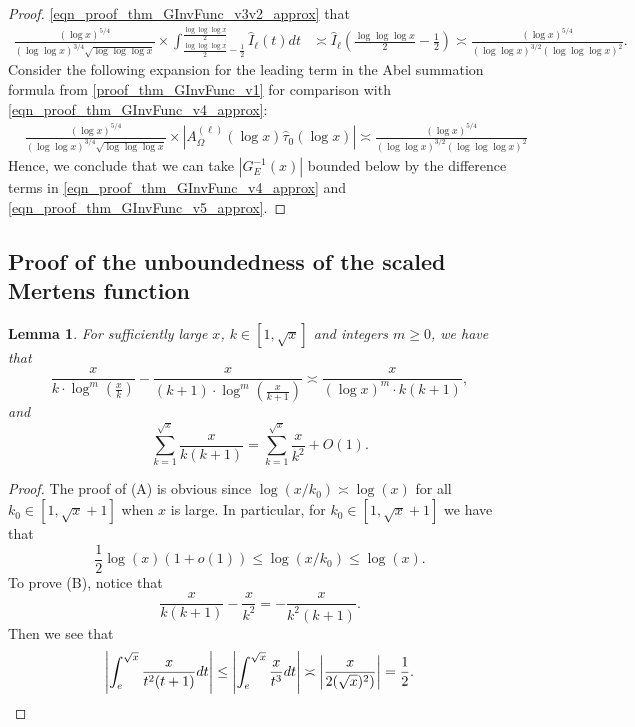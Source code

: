\documentclass[11pt,reqno,a4letter]{article}
\numberwithin{figure}{section}
\numberwithin{table}{section}
\theoremstyle{plain}
\newtheorem{lemma}[theorem]{Lemma}
\numberwithin{theorem}{section}
\theoremstyle{definition}
\begin{document}
\begin{proof}
\eqref{eqn_proof_thm_GInvFunc_v3v2_approx} that 
\begin{align} 
\label{eqn_proof_thm_GInvFunc_v4_approx} 
\frac{(\log x)^{5/4}}{(\log\log x)^{3/4} \sqrt{\log\log\log x}} \times 
     \int_{\frac{\log\log\log x}{2}-\frac{1}{2}}^{\frac{\log\log\log x}{2}} 
     \widehat{I}_{\ell}(t) dt & \asymp 
     \widehat{I}_{\ell}\left(\frac{\log\log\log x}{2}-\frac{1}{2}\right) 
     \asymp \frac{(\log x)^{5/4}}{(\log\log x)^{3/2}(\log\log\log x)^2}. 
\end{align} 
Consider the following expansion for the leading term in 
the Abel summation formula from \eqref{proof_thm_GInvFunc_v1} for comparison with 
\eqref{eqn_proof_thm_GInvFunc_v4_approx}: 
\begin{align} 
\label{eqn_proof_thm_GInvFunc_v5_approx} 
 & \frac{(\log x)^{5/4}}{(\log\log x)^{3/4} \sqrt{\log\log\log x}} \times 
     \left\lvert A_{\Omega}^{(\ell)}(\log x) \widehat{\tau}_0(\log x) \right\rvert 
     \asymp 
     \frac{(\log x)^{5/4}}{(\log\log x)^{3/2} (\log\log\log x)^2}
\end{align} 
Hence, we conclude that we can take $\left\lvert G_{E}^{-1}\left(x\right) \right\rvert$ 
bounded below by the difference terms in 
\eqref{eqn_proof_thm_GInvFunc_v4_approx} and 
\eqref{eqn_proof_thm_GInvFunc_v5_approx}. 
\end{proof} 

\subsection{Proof of the unboundedness of the scaled Mertens function}
\label{subSection_TheCoreResultProof} 

\begin{lemma}
\label{lemma_PrimePix_ErrorBoundDiffs_SimplifyingConditions_v1} 
For sufficiently large $x$, $k \in [1, \sqrt{x}]$ and integers $m \geq 0$, we have that 
\begin{equation} 
\tag{A} 
\frac{x}{k \cdot \log^m\left(\frac{x}{k}\right)} - \frac{x}{(k+1) \cdot \log^m\left(\frac{x}{k+1}\right)}
     \asymp \frac{x}{(\log x)^m \cdot k(k+1)}, 
\end{equation} 
and 
\begin{equation} 
\tag{B} 
\sum_{k=1}^{\sqrt{x}} \frac{x}{k(k+1)} = \sum_{k=1}^{\sqrt{x}} \frac{x}{k^2} + O(1). 
\end{equation} 
\end{lemma} 
\begin{proof} 
The proof of (A) is obvious since $\log(x/k_0) \asymp \log(x)$ for all $k_0 \in [1, \sqrt{x} + 1]$ when $x$ is 
large. In particular, for $k_0 \in [1, \sqrt{x} + 1]$ we have that 
\[
\frac{1}{2}\log(x) (1 + o(1)) \leq \log(x/k_0) \leq \log(x). 
\]
To prove (B), notice that 
\[
\frac{x}{k(k+1)} - \frac{x}{k^2} = -\frac{x}{k^2(k+1)}. 
\]
Then we see that 
\[
\left\lvert \int_e^{\sqrt{x}} \frac{x}{t^2(t+1)} dt \right\rvert \leq 
     \left\lvert \int_e^{\sqrt{x}} \frac{x}{t^3} dt \right\rvert \asymp 
     \left\lvert \frac{x}{2 (\sqrt{x})^2)} \right\rvert = \frac{1}{2}. 
     \qedhere 
\]
\end{proof} 
\end{document}
